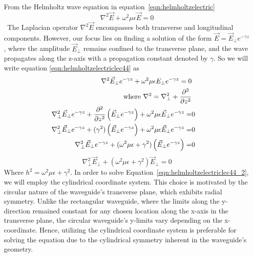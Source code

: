 From the Helmholtz wave equation in equation~\eqref{eqn:helmholtzelectric} 
\begin{equation}
\nabla^2\vec{E} + \omega^2\mu\epsilon\vec{E}=0
\label{eqn:helmholtzelectriclec44}
\end{equation}\
The Laplacian operator $\nabla^2\vec{E}$ encompasses both transverse and longitudinal components. However, our focus lies on finding a solution of the form $\vec{E}=\vec{E}_{\bot}e^{-\gamma z}$, where the amplitude $\vec{E}_\bot$ remains confined to the transverse plane, and the wave propagates along the z-axis with a propagation constant denoted by $\gamma$. So we will write equation \ref{eqn:helmholtzelectriclec44} as
\begin{align*}
\nabla^2\vec{E}_\perp e^{-\gamma z} + \omega^2 \mu\epsilon E_\perp e^{-\gamma z} = 0\\\text{where }\nabla^2 = \nabla^2_\perp + \partialderivative[2]{}{z}&\\
\nabla^2_\perp\vec{E}_\perp e^{-\gamma z} + \partialderivative[2]{}{z}\left(\vec{E}_\perp e^{-\gamma z}\right) + \omega^2\mu\epsilon\vec{E}_\perp e^{-\gamma z} =&  0\\
\nabla^2_\perp\vec{E}_\perp e^{-\gamma z} + (\gamma^2)\left(\vec{E}_\perp e^{-\gamma z}\right) + \omega^2\mu\epsilon\vec{E}_\perp e^{-\gamma z} =& 0\\
\nabla^2_\perp\vec{E}_\perp e^{-\gamma z} + (\omega^2\mu\epsilon + \gamma^2)\left(\vec{E}_\perp e^{-\gamma z}\right) =& 0
\end{align*}
\begin{equation}
\nabla^2_\perp\vec{E}_\perp + (\omega^2\mu\epsilon + \gamma^2)\vec{E}_\perp = 0
\label{eqn:helmholtzelectriclec44_2}
\end{equation}
Where $h^2 = \omega^2\mu\epsilon + \gamma^2$. In order to solve Equation~\ref{eqn:helmholtzelectriclec44_2}, we will employ the cylindrical coordinate system. This choice is motivated by the circular nature of the waveguide's transverse plane, which exhibits radial symmetry. Unlike the rectangular waveguide, where the limits along the y-direction remained constant for any chosen location along the x-axis in the transverse plane, the circular waveguide's y-limits vary depending on the x-coordinate. Hence, utilizing the cylindrical coordinate system is preferable for solving the equation due to the cylindrical symmetry inherent in the waveguide's geometry.
 
